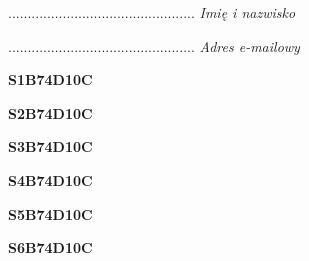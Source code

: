 \begin{turn}{90}\begin{minipage}{\linewidth} \vspace{20mm} ................................................  \textit{Imię i nazwisko}\end{minipage}\end{turn}

\begin{turn}{90}\begin{minipage}{\linewidth} \vspace{20mm} ................................................  \textit{Adres e-mailowy}\end{minipage}\end{turn}

\begin{turn}{90}\huge \begin{minipage}{\linewidth} \vspace{10mm}\textbf{S1B74D10C}\end{minipage}\end{turn}

\begin{turn}{90}\huge \begin{minipage}{\linewidth} \vspace{10mm}\textbf{S2B74D10C}\end{minipage}\end{turn}

\begin{turn}{90}\huge \begin{minipage}{\linewidth} \vspace{10mm}\textbf{S3B74D10C}\end{minipage}\end{turn}

\begin{turn}{90}\huge \begin{minipage}{\linewidth} \vspace{10mm}\textbf{S4B74D10C}\end{minipage}\end{turn}

\begin{turn}{90}\huge \begin{minipage}{\linewidth} \vspace{10mm}\textbf{S5B74D10C}\end{minipage}\end{turn}

\begin{turn}{90}\huge \begin{minipage}{\linewidth} \vspace{10mm}\textbf{S6B74D10C}\end{minipage}\end{turn}

